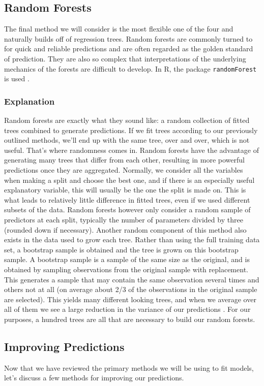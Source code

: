 \documentclass[12pt]{article}\usepackage[]{graphicx}\usepackage[]{color}
\begin{document}
\subsection{Random Forests}
The final method we will consider is the most flexible one of the four and naturally builds off of regression trees. Random forests are commonly turned to for quick and reliable predictions and are often regarded as the golden standard of prediction. They are also so complex that interpretations of the underlying mechanics of the forests are difficult to develop. In R, the package \texttt{randomForest} is used \cite{randomForest}.

\subsubsection{Explanation}
Random forests are exactly what they sound like: a random collection of fitted trees combined to generate predictions. If we fit trees according to our previously outlined methods, we'll end up with the same tree, over and over, which is not useful. That's where randomness comes in. Random forests have the advantage of generating many trees that differ from each other, resulting in more powerful predictions once they are aggregated. Normally, we consider all the variables when making a split and choose the best one, and if there is an especially useful explanatory variable, this will usually be the one the split is made on. This is what leads to relatively little difference in fitted trees, even if we used different subsets of the data. Random forests however only consider a random sample of predictors at each split, typically the number of parameters divided by three (rounded down if necessary). Another random component of this method also exists in the data used to grow each tree. Rather than using the full training data set, a bootstrap sample is obtained and the tree is grown on this bootstrap sample. A bootstrap sample is a sample of the same size as the original, and is obtained by sampling observations from the original sample with replacement. This generates a sample that may contain the same observation several times and others not at all (on average about 2/3 of the observations in the original sample are selected). This yields many different looking trees, and when we average over all of them we see a large reduction in the variance of our predictions \cite{gam}. For our purposes, a hundred trees are all that are necessary to build our random forests.

\subsection{Improving Predictions}
Now that we have reviewed the primary methods we will be using to fit models, let's discuss a few methods for improving our predictions.
\end{document}
